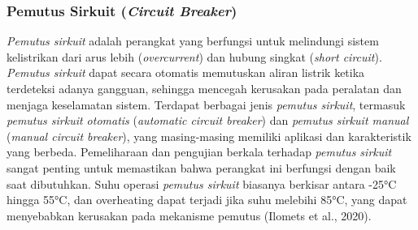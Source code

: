 \subsubsection{Pemutus Sirkuit (\emph{Circuit Breaker})}

\emph{Pemutus sirkuit} adalah perangkat yang berfungsi untuk melindungi sistem kelistrikan dari arus lebih (\emph{overcurrent}) dan hubung singkat (\emph{short circuit}). \emph{Pemutus sirkuit} dapat secara otomatis memutuskan aliran listrik ketika terdeteksi adanya gangguan, sehingga mencegah kerusakan pada peralatan dan menjaga keselamatan sistem. Terdapat berbagai jenis \emph{pemutus sirkuit}, termasuk \emph{pemutus sirkuit otomatis} (\emph{automatic circuit breaker}) dan \emph{pemutus sirkuit manual} (\emph{manual circuit breaker}), yang masing-masing memiliki aplikasi dan karakteristik yang berbeda. Pemeliharaan dan pengujian berkala terhadap \emph{pemutus sirkuit} sangat penting untuk memastikan bahwa perangkat ini berfungsi dengan baik saat dibutuhkan. Suhu operasi \emph{pemutus sirkuit} biasanya berkisar antara -25°C hingga 55°C, dan overheating dapat terjadi jika suhu melebihi 85°C, yang dapat menyebabkan kerusakan pada mekanisme pemutus (Ilomets et al., 2020).